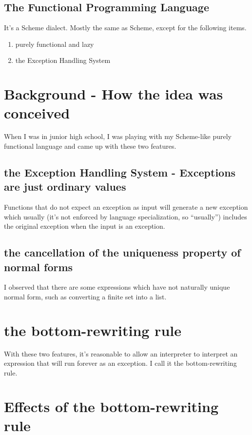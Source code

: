 \documentclass[11pt,preprint,numbers]{sigplanconf}
\begin{document}
\subsection{The Functional Programming Language}

It's a Scheme dialect. Mostly the same as Scheme, except for the following items.

\begin{enumerate}
\item purely functional and lazy
\item the Exception Handling System
\end{enumerate}

\section{Background - How the idea was conceived}

When I was in junior high school, I was playing with my Scheme-like purely functional language and
came up with these two features.

\subsection{the Exception Handling System - Exceptions are just ordinary values}

Functions that do not expect an exception as input will generate a new exception which usually (it's not enforced by language specialization, so ``usually'') includes the original exception when the input is an exception.

\subsection{the cancellation of the uniqueness property of normal forms}

I observed that there are some expressions which have not naturally unique normal form, such as converting a finite set into a list.

\section{the bottom-rewriting rule}

With these two features,
it's reasonable to allow an interpreter to interpret an expression that will run forever as an exception.
I call it the bottom-rewriting rule.

\section{Effects of the bottom-rewriting rule}
\end{document}
